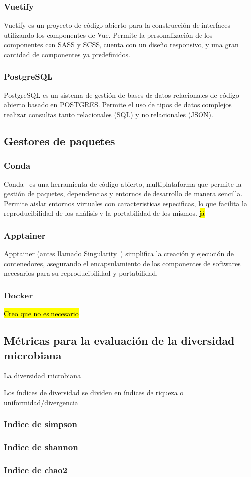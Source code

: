 \subsubsection{Vuetify}
Vuetify es un proyecto de código abierto para la construcción de interfaces utilizando los componentes de Vue. Permite la personalización de los componentes con SASS y SCSS, cuenta con un diseño responsivo, y una gran cantidad de componentes ya predefinidos.
\subsubsection{PostgreSQL}
PostgreSQL es un sistema de gestión de bases de datos relacionales de código abierto basado en POSTGRES. Permite el uso de tipos de datos complejos realizar consultas tanto relacionales (SQL) y no relacionales (JSON).

\subsection{Gestores de paquetes}
\subsubsection{Conda}
Conda~\cite{anaconda}  es una herramienta de código abierto, multiplataforma  que permite la gestión de paquetes, dependencias y entornos de desarrollo de manera sencilla. Permite aislar entornos virtuales con caracteristicas especificas, lo que facilita la reproducibilidad de los análisis y la portabilidad de los mismos. \hl{já}
\subsubsection{Apptainer}
Apptainer (antes llamado Singularity~\cite{kurtzer2017singularity}) simplifica la creación y ejecución de contenedores, asegurando el encapsulamiento de los componentes de softwares necesarios para su reproducibilidad y portabilidad.  
\subsubsection{Docker}
\hl{Creo que no es necesario}

\subsection{Métricas para la evaluación de la diversidad microbiana}
La diversidad microbiana 

Los índices de diversidad se dividen en índices de riqueza o uniformidad/divergencia
\subsubsection{Indice de simpson}
\subsubsection{Indice de shannon}
\subsubsection{Indice de chao2}

